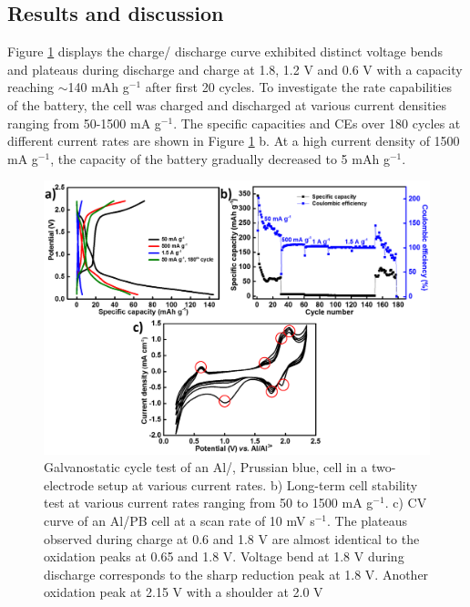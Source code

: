 \subsection{Results and discussion}
Figure \ref{Figures/chap6fig:pbcdccecv} displays the charge/ discharge curve exhibited distinct voltage bends and plateaus during discharge and charge at 1.8, 1.2 V and 0.6 V with a capacity reaching $\sim$140 mAh g$^{-1}$ after first 20 cycles. To investigate the rate capabilities of the battery, the cell was charged and discharged at various current densities ranging from 50-1500 mA g$^{-1}$. The specific capacities and CEs over 180 cycles at different current rates are shown in Figure \ref{Figures/chap6fig:pbcdccecv} b. At a high current density of 1500 mA g$^{-1}$, the capacity of the battery gradually decreased to 5 mAh g$^{-1}$. 

 \begin{figure}[tbh!]
  \centering
  \includegraphics[width=\textwidth]{Figures/chap6fig/pbcdccecv}
    \caption{Galvanostatic cycle test of an Al/, Prussian blue, cell in a two-electrode setup at various current rates. b) Long-term cell stability test at various current rates ranging from 50 to 1500 mA g$^{-1}$. c) CV curve of an Al/PB cell at a scan rate of 10 mV s$^{-1}$. The plateaus observed during charge at 0.6 and 1.8 V are almost identical to the oxidation peaks at 0.65 and 1.8 V. Voltage bend at 1.8 V during discharge corresponds to the sharp reduction peak at 1.8 V. Another oxidation peak at 2.15 V with a shoulder at 2.0 V }
  \label{Figures/chap6fig:pbcdccecv}
\end{figure}

